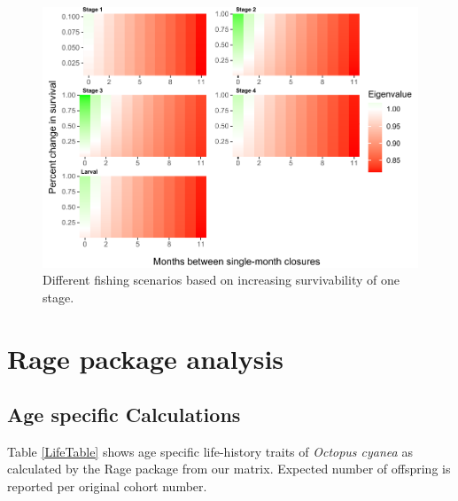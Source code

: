 \documentclass[
]{article}
\begin{document}
\begin{figure}
\centering
\includegraphics{Wulfing_CH1_Appendix_files/figure-latex/stagemo-1.pdf}
\caption{\label{fig:stagemo}Different fishing scenarios based on increasing survivability of one stage. \label{stagemo}}
\end{figure}

\hypertarget{rage-package-analysis}{%
\section{Rage package analysis}\label{rage-package-analysis}}

\hypertarget{age-specific-calculations}{%
\subsection{Age specific Calculations}\label{age-specific-calculations}}

Table \ref{LifeTable} shows age specific life-history traits of \emph{Octopus cyanea} as calculated by the Rage package from our matrix. Expected number of offspring is reported per original cohort number.
\end{document}
